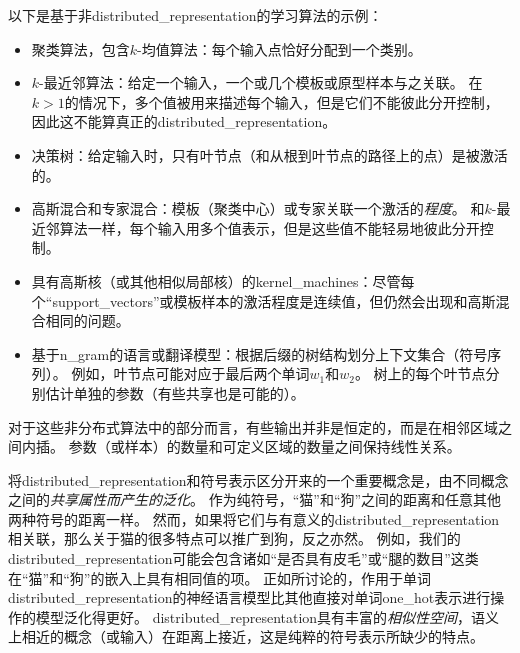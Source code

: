 以下是基于非\gls{distributed_representation}的学习算法的示例：
\begin{itemize}
	\item 聚类算法，包含$k$-均值算法：每个输入点恰好分配到一个类别。

	\item $k$-最近邻算法：给定一个输入，一个或几个模板或原型样本与之关联。
	在$k > 1$的情况下，多个值被用来描述每个输入，但是它们不能彼此分开控制，因此这不能算真正的\gls{distributed_representation}。

	\item 决策树：给定输入时，只有叶节点（和从根到叶节点的路径上的点）是被激活的。

	\item 高斯混合和专家混合：模板（聚类中心）或专家关联一个激活的\emph{程度}。
	和$k$-最近邻算法一样，每个输入用多个值表示，但是这些值不能轻易地彼此分开控制。

	\item 具有高斯核（或其他相似局部核）的\gls{kernel_machines}：尽管每个``\gls{support_vectors}''或模板样本的激活程度是连续值，但仍然会出现和高斯混合相同的问题。

	\item 基于\gls{n_gram}的语言或翻译模型：根据后缀的树结构划分上下文集合（符号序列）。
	例如，叶节点可能对应于最后两个单词$w_1$和$w_2$。
	树上的每个叶节点分别估计单独的参数（有些共享也是可能的）。
\end{itemize}


对于这些非分布式算法中的部分而言，有些输出并非是恒定的，而是在相邻区域之间内插。
参数（或样本）的数量和可定义区域的数量之间保持线性关系。


将\gls{distributed_representation}和符号表示区分开来的一个重要概念是，由不同概念之间的\emph{共享属性而产生的泛化}。
作为纯符号，``猫''和``狗''之间的距离和任意其他两种符号的距离一样。
然而，如果将它们与有意义的\gls{distributed_representation}相关联，那么关于猫的很多特点可以推广到狗，反之亦然。
例如，我们的\gls{distributed_representation}可能会包含诸如``是否具有皮毛''或``腿的数目''这类在``猫''和``狗''的嵌入上具有相同值的项。
正如所讨论的，作用于单词\gls{distributed_representation}的神经语言模型比其他直接对单词\gls{one_hot}表示进行操作的模型泛化得更好。
\gls{distributed_representation}具有丰富的\emph{相似性空间}，语义上相近的概念（或输入）在距离上接近，这是纯粹的符号表示所缺少的特点。


